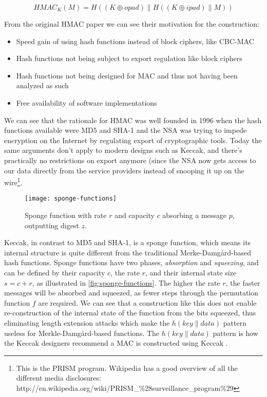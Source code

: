 \begin{equation}
HMAC_K(M) = H( (K \oplus opad ) \| H((K \oplus ipad) \| M))
\end{equation}\label{eq:hmac}

From the original HMAC paper \cite{hmac} we can see their motivation for the construction:

\begin{itemize}
    \item Speed gain of using hash functions instead of block ciphers, like CBC-MAC
    \item Hash functions not being subject to export regulation like block ciphers
    \item Hash functions not being designed for MAC and thus not having been analyzed as such
    \item Free availability of software implementations
\end{itemize}

We can see that the rationale for HMAC was well founded in 1996 when the hash functions available were MD5 and SHA-1 and the NSA was trying to impede encryption on the Internet by regulating export of cryptographic tools. Today the same arguments don't apply to modern designs such as Keccak, and there's practically no restrictions on export anymore (since the NSA now gets access to our data directly from the service providers instead of snooping it up on the wire\footnote{This is the PRISM program. Wikipedia has a good overview of all the different media disclosures: http://en.wikipedia.org/wiki/PRISM\_\%28surveillance\_program\%29}.

\begin{figure}[ht!]
\centering
    \texttt{[image: sponge-functions]}
    \caption{Sponge function with rate $r$ and capacity $c$ absorbing a message $p$, outputting digest $z$.}\label{fig:sponge-functions}
\end{figure}

Keccak, in contrast to MD5 and SHA-1, is a sponge function, which means its internal structure is quite different from the traditional Merke-Damgård-based hash functions. Sponge functions have two phases, \emph{absorption} and \emph{squeezing}, and can be defined by their capacity $c$, the rate $r$, and their internal state size $s=c+r$, as illustrated in \autoref{fig:sponge-functions}. The higher the rate $r$, the faster messages will be absorbed and squeezed, as fewer steps through the permutation function $f$ are required. We can see that a construction like this does not enable re-construction of the internal state of the function from the bits squeezed, thus eliminating length extension attacks which make the \( h(key \| data ) \) pattern useless for Merkle-Damgård-based functions. The \(h(key \| data) \) pattern is how the Keccak designers recommend a MAC is constructed using Keccak \cite{sponge-functions}.


